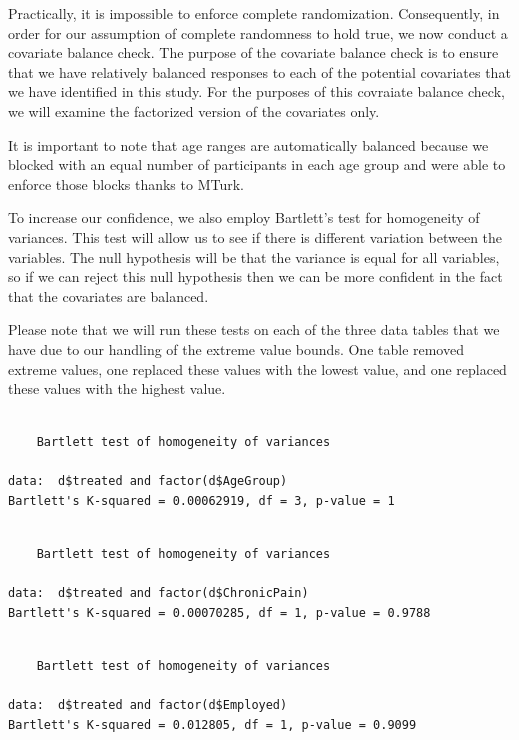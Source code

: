 \documentclass[
]{article}
\begin{document}
Practically, it is impossible to enforce complete randomization.
Consequently, in order for our assumption of complete randomness to hold
true, we now conduct a covariate balance check. The purpose of the
covariate balance check is to ensure that we have relatively balanced
responses to each of the potential covariates that we have identified in
this study. For the purposes of this covraiate balance check, we will
examine the factorized version of the covariates only.

It is important to note that age ranges are automatically balanced
because we blocked with an equal number of participants in each age
group and were able to enforce those blocks thanks to MTurk.

To increase our confidence, we also employ Bartlett's test for
homogeneity of variances. This test will allow us to see if there is
different variation between the variables. The null hypothesis will be
that the variance is equal for all variables, so if we can reject this
null hypothesis then we can be more confident in the fact that the
covariates are balanced.

Please note that we will run these tests on each of the three data
tables that we have due to our handling of the extreme value bounds. One
table removed extreme values, one replaced these values with the lowest
value, and one replaced these values with the highest value.

\begin{verbatim}

    Bartlett test of homogeneity of variances

data:  d$treated and factor(d$AgeGroup)
Bartlett's K-squared = 0.00062919, df = 3, p-value = 1
\end{verbatim}

\begin{verbatim}

    Bartlett test of homogeneity of variances

data:  d$treated and factor(d$ChronicPain)
Bartlett's K-squared = 0.00070285, df = 1, p-value = 0.9788
\end{verbatim}

\begin{verbatim}

    Bartlett test of homogeneity of variances

data:  d$treated and factor(d$Employed)
Bartlett's K-squared = 0.012805, df = 1, p-value = 0.9099
\end{verbatim}
\end{document}
